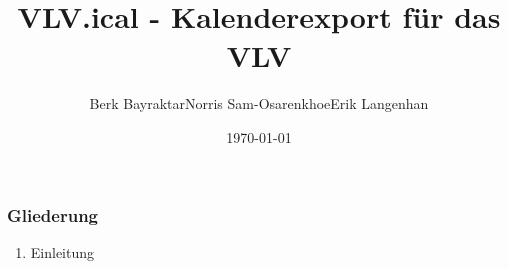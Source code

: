\documentclass[10pt]{beamer}
\author{Berk Bayraktar\quad Norris Sam-Osarenkhoe\quad Erik Langenhan}
\title[VLV.ical]{VLV.ical - Kalenderexport für das VLV}
\date{\today}
\begin{document}
\frame{\titlepage}

\begin{frame}
    \frametitle{Gliederung}
    \begin{enumerate}
        \item{Einleitung}
    \end{enumerate}

\end{frame}
\end{document}
